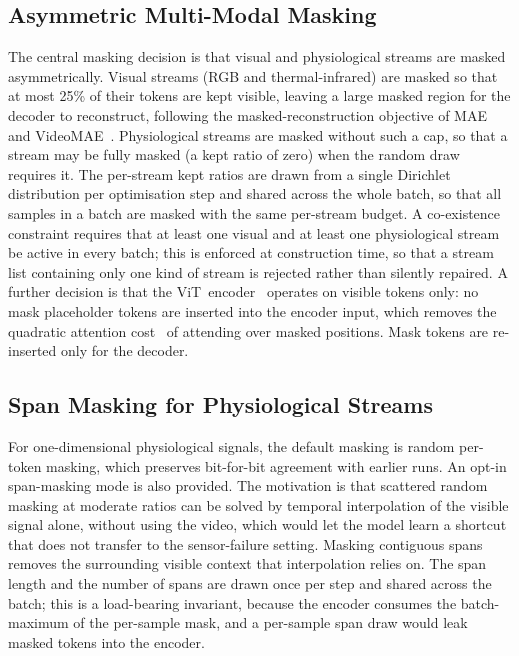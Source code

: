\subsection{Asymmetric Multi-Modal Masking}
\label{sec:impl-design-amm}

The central masking decision is that visual and physiological streams are masked
asymmetrically. Visual streams (RGB and thermal-infrared) are masked so that at most 25\%
of their tokens are kept visible, leaving a large masked region for the decoder to
reconstruct, following the masked-reconstruction objective of
MAE~\cite{he2021maskedMAE} and VideoMAE~\cite{tong2022videomae}. Physiological streams are
masked without such a cap, so that a stream may be fully masked (a kept ratio of zero) when
the random draw requires it. The per-stream kept ratios are drawn from a single Dirichlet
distribution per optimisation step and shared across the whole batch, so that all samples
in a batch are masked with the same per-stream budget. A co-existence constraint requires
that at least one visual and at least one physiological stream be active in every batch;
this is enforced at construction time, so that a stream list containing only one kind of
stream is rejected rather than silently repaired. A further decision is that the
ViT~encoder~\cite{dosovitskiy2021image} operates on visible tokens only: no mask
placeholder tokens are inserted into the encoder input, which removes the quadratic
attention cost~\cite{vaswani2017attention} of attending over masked positions. Mask tokens
are re-inserted only for the decoder.

\subsection{Span Masking for Physiological Streams}
\label{sec:impl-design-span}

For one-dimensional physiological signals, the default masking is random per-token masking,
which preserves bit-for-bit agreement with earlier runs. An opt-in span-masking mode is
also provided. The motivation is that scattered random masking at moderate ratios can be
solved by temporal interpolation of the visible signal alone, without using the video, which
would let the model learn a shortcut that does not transfer to the sensor-failure setting.
Masking contiguous spans removes the surrounding visible context that interpolation relies
on. The span length and the number of spans are drawn once per step and shared across the
batch; this is a load-bearing invariant, because the encoder consumes the batch-maximum of
the per-sample mask, and a per-sample span draw would leak masked tokens into the encoder.

